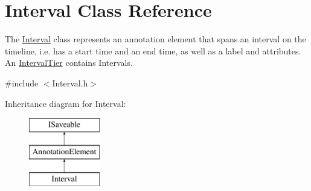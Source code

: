 \hypertarget{class_interval}{}\section{Interval Class Reference}
\label{class_interval}


The \hyperlink{class_interval}{Interval} class represents an annotation element that spans an interval on the timeline, i.\+e. has a start time and an end time, as well as a label and attributes. An \hyperlink{class_interval_tier}{Interval\+Tier} contains Intervals.  




{\ttfamily \#include $<$Interval.\+h$>$}

Inheritance diagram for Interval\+:\begin{figure}[H]
\begin{center}
\leavevmode
\includegraphics[height=3.000000cm]{class_interval}
\end{center}
\end{figure}
